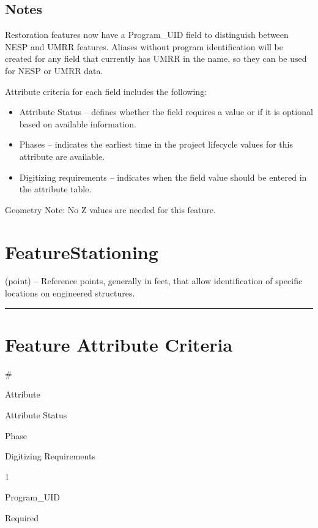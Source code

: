 \documentclass[
  letterpaper,
  DIV=11,
  numbers=noendperiod]{scrreprt}
\providecommand{\tightlist}{%
  \setlength{\itemsep}{0pt}\setlength{\parskip}{0pt}}
\begin{document}
\subsection{Notes}\label{notes-24}

Restoration features now have a Program\_UID field to distinguish
between NESP and UMRR features. Aliases without program identification
will be created for any field that currently has UMRR in the name, so
they can be used for NESP or UMRR data.

Attribute criteria for each field includes the following:

\begin{itemize}
\tightlist
\item
  Attribute Status -- defines whether the field requires a value or if
  it is optional based on available information.
\item
  Phases -- indicates the earliest time in the project lifecycle values
  for this attribute are available.
\item
  Digitizing requirements -- indicates when the field value should be
  entered in the attribute table.
\end{itemize}

Geometry Note: No Z values are needed for this feature.

\section{FeatureStationing}\label{featurestationing}

(point) -- Reference points, generally in feet, that allow
identification of specific locations on engineered structures.

\begin{center}\rule{0.5\linewidth}{0.5pt}\end{center}

\section{Feature Attribute
Criteria}\label{feature-attribute-criteria-21}

\#

Attribute

Attribute Status

Phase

Digitizing Requirements

1

Program\_UID

Required
\end{document}
